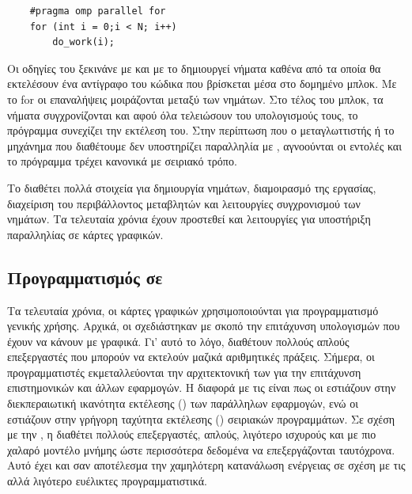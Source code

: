 \begin{center}
\begin{minipage}{0.5\textwidth}
\begin{verbatim}
    #pragma omp parallel for
    for (int i = 0;i < N; i++)
        do_work(i);
\end{verbatim}
\end{minipage}
\end{center}

Οι οδηγίες του  ξεκινάνε με  και με το  δημιουργεί νήματα καθένα από τα οποία θα εκτελέσουν ένα αντίγραφο του κώδικα που βρίσκεται μέσα στο δομημένο μπλοκ. Με το for οι επαναλήψεις μοιράζονται μεταξύ των νημάτων. Στο τέλος του μπλοκ, τα νήματα συγχρονίζονται και αφού όλα τελειώσουν του υπολογισμούς τους, το πρόγραμμα συνεχίζει την εκτέλεση του. Στην περίπτωση που ο μεταγλωττιστής ή το μηχάνημα που διαθέτουμε δεν υποστηρίζει παραλληλία με , αγνοούνται οι εντολές  και το πρόγραμμα τρέχει κανονικά με σειριακό τρόπο.

Το  διαθέτει πολλά στοιχεία για δημιουργία νημάτων, διαμοιρασμό της εργασίας, διαχείριση του περιβάλλοντος μεταβλητών και λειτουργίες συγχρονισμού των νημάτων. Τα τελευταία χρόνια έχουν προστεθεί και λειτουργίες για υποστήριξη παραλληλίας σε κάρτες γραφικών.

\subsection{Προγραμματισμός σε }

Τα τελευταία χρόνια, οι κάρτες γραφικών χρησιμοποιούνται για προγραμματισμό γενικής χρήσης. Αρχικά, οι  σχεδιάστηκαν με σκοπό την επιτάχυνση υπολογισμών που έχουν να κάνουν με γραφικά. Γι’ αυτό το λόγο, διαθέτουν πολλούς απλούς επεξεργαστές που μπορούν να εκτελούν μαζικά αριθμητικές πράξεις. Σήμερα, οι προγραμματιστές εκμεταλλεύονται την αρχιτεκτονική των  για την επιτάχυνση επιστημονικών και άλλων εφαρμογών. 
Η διαφορά με τις  είναι πως οι  εστιάζουν στην διεκπεραιωτική ικανότητα εκτέλεσης () των παράλληλων εφαρμογών, ενώ οι  εστιάζουν στην γρήγορη ταχύτητα εκτέλεσης () σειριακών προγραμμάτων. Σε σχέση με την , η  διαθέτει πολλούς επεξεργαστές, απλούς, λιγότερο ισχυρούς και με πιο χαλαρό μοντέλο μνήμης ώστε περισσότερα δεδομένα να επεξεργάζονται ταυτόχρονα. Αυτό έχει και σαν αποτέλεσμα την χαμηλότερη κατανάλωση ενέργειας σε σχέση με τις  αλλά λιγότερο ευέλικτες προγραμματιστικά. 
 
